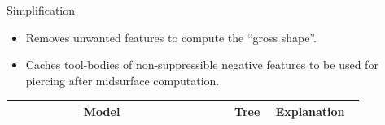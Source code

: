 \begin{frame}{Simplification}
\begin{itemize}[noitemsep,label=\textbullet,topsep=2pt,parsep=2pt,partopsep=2pt]
\item Removes unwanted features to compute the ``gross shape''. 
\item Caches tool-bodies of non-suppressible negative features to be used for piercing after midsurface computation. 
\end{itemize}
\def\myfigenlosuredefeaturecolumnwidth{0.95}
\def\myfigenlosuredefeatureTreecolumnwidth{0.75}
\begin{tabular}[h]{@{} p{0.18\linewidth}  p{0.38\linewidth} p{0.1\linewidth} p{0.2\linewidth}@{}}
\toprule
 & Model & Tree & Explanation \\
 \midrule
 

\end{tabular}
\end{frame}
